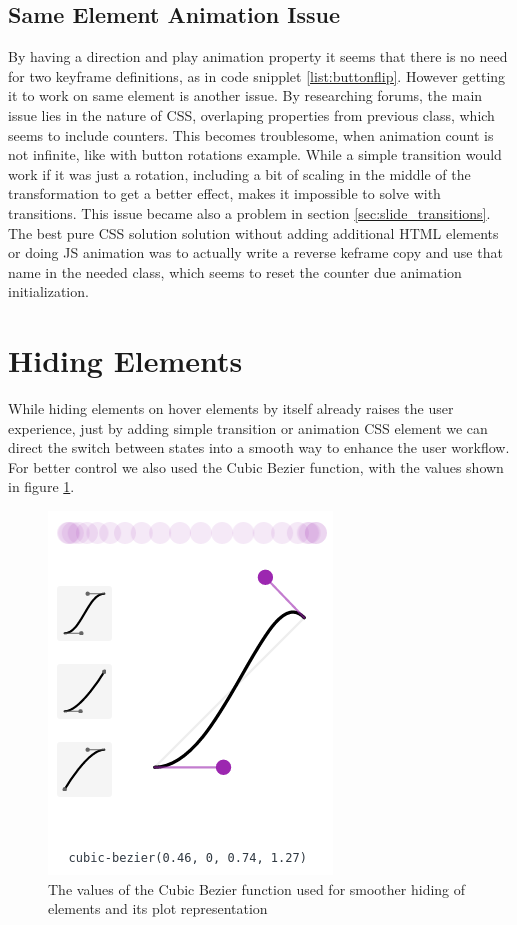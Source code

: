 \subsection{Same Element Animation Issue} %
\label{sub:same_element_animation_issue}

By having a direction and play animation property it seems that there is no 
need for two keyframe definitions, as in code snipplet \ref{list:buttonflip}. 
However getting it to work on same element is another issue. By researching 
forums, the main issue lies in the nature of CSS, overlaping properties from 
previous class, which seems to include counters. This becomes troublesome, when 
animation count is not infinite, like with button rotations example. While a 
simple transition would work if it was just a rotation, including a bit of 
scaling in the middle of the transformation to get a better effect, makes it 
impossible to solve with transitions. This issue became also a problem in 
section \ref{sec:slide_transitions}. The best pure CSS solution solution 
without adding additional HTML elements or doing JS animation was to actually 
write a reverse keframe copy and use that name in the needed class, which seems 
to reset the counter due animation initialization.



\section{Hiding Elements} %
\label{sec:hiding_elements}

While hiding elements on hover elements by itself already raises the user 
experience, just by adding simple transition or animation CSS element we can 
direct the switch between states into a smooth way to enhance the user 
workflow. For better control we also used the Cubic Bezier function, with the 
values shown in figure \ref{fig:cubic-bezier}.

\begin{figure}[tp]
	\centering
	\includegraphics[width = .4\textwidth]{images/cubic-bezier.png}
	
	\caption[Cubic Bezier Function]{
		The values of the Cubic Bezier function used for smoother 
hiding of elements and its plot representation
	}
	\label{fig:cubic-bezier}
\end{figure}

